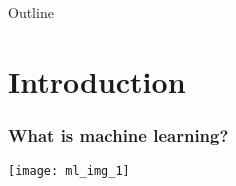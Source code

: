 \documentclass[usenames,dvipsnames,smaller]{beamer}
\newcommand{\?}{\stackrel{?}{=}}
\begin{document}

  


\begin{frame}{Outline}
  \tableofcontents
\end{frame}

\section{Introduction}
  
  






  

  

\begin{frame}
  \frametitle{What is machine learning?}

  \begin{center}
    \texttt{[image: ml\_img\_1]}
  \end{center}
\end{frame}
\end{document}
